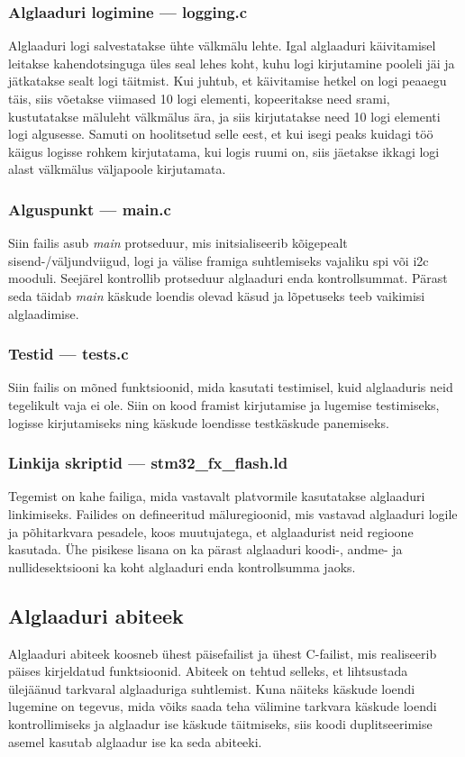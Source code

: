 \documentclass[12pt,a4paper]{article}
\begin{document}
\subsubsection{Alglaaduri logimine --- \textbf{logging.c}}
Alglaaduri logi salvestatakse ühte välkmälu lehte. Igal alglaaduri käivitamisel
leitakse kahendotsinguga üles seal lehes koht, kuhu logi kirjutamine pooleli jäi
ja jätkatakse sealt logi täitmist. Kui juhtub, et käivitamise hetkel on logi
peaaegu täis, siis võetakse viimased 10 logi elementi, kopeeritakse need
\gls{sram}i, kustutatakse mäluleht välkmälus ära, ja siis kirjutatakse need 10
logi elementi logi algusesse. Samuti on hoolitsetud selle eest, et kui isegi
peaks kuidagi töö käigus logisse rohkem kirjutatama, kui logis ruumi on, siis
jäetakse ikkagi logi alast välkmälus väljapoole kirjutamata.

\subsubsection{Alguspunkt --- \textbf{main.c}}
Siin failis asub \textit{main} protseduur, mis initsialiseerib kõigepealt
sisend-/väljundviigud, logi ja välise \gls{fram}iga suhtlemiseks vajaliku
\gls{spi} või \gls{i2c} mooduli. Seejärel kontrollib protseduur alglaaduri enda
kontrollsummat. Pärast seda täidab \textit{main} käskude loendis olevad käsud ja
lõpetuseks teeb vaikimisi alglaadimise.

\subsubsection{Testid --- \textbf{tests.c}}
Siin failis on mõned funktsioonid, mida kasutati testimisel, kuid alglaaduris
neid tegelikult vaja ei ole. Siin on kood \gls{fram}ist kirjutamise ja lugemise
testimiseks, logisse kirjutamiseks ning käskude loendisse testkäskude
panemiseks.

\subsubsection{Linkija skriptid --- \textbf{stm32\_fx\_flash.ld}}
Tegemist on kahe failiga, mida vastavalt platvormile kasutatakse alglaaduri
linkimiseks. Failides on defineeritud mäluregioonid, mis vastavad alglaaduri
logile ja põhitarkvara pesadele, koos muutujatega, et alglaadurist neid regioone
kasutada. Ühe pisikese lisana on ka pärast alglaaduri koodi-, andme- ja
nullidesektsiooni ka koht alglaaduri enda kontrollsumma jaoks.

\subsection{Alglaaduri abiteek}
Alglaaduri abiteek koosneb ühest päisefailist ja ühest C-failist, mis
realiseerib päises kirjeldatud funktsioonid. Abiteek on tehtud selleks, et
lihtsustada ülejäänud tarkvaral alglaaduriga suhtlemist. Kuna näiteks käskude
loendi lugemine on tegevus, mida võiks saada teha välimine tarkvara käskude
loendi kontrollimiseks ja alglaadur ise käskude täitmiseks, siis koodi
duplitseerimise asemel kasutab alglaadur ise ka seda abiteeki.
\end{document}
